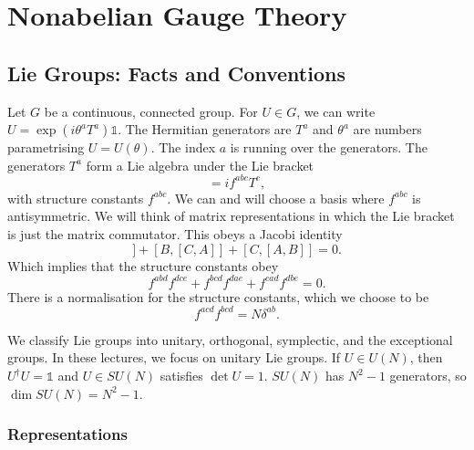 
\chapter{Nonabelian Gauge Theory}%
\label{cha:nonabelian_gauge_theory}

\section{Lie Groups: Facts and Conventions}%
\label{sec:lie_groups_facts_and_conventions}

Let $G$ be a continuous, connected group.
For $U \in G$, we can write $U = \exp(i \theta^{a} T^{a}) \mathbb{1}$.
The Hermitian generators are $T^{a}$ and $\theta^{a}$ are numbers parametrising $U = U(\theta)$.
The index $a$ is running over the generators.
The generators $T^{a}$ form a Lie algebra under the Lie bracket
\begin{equation}
  [T^{a}, T^{b}] = i f^{abc} T^{c},
\end{equation}
with structure constants $f^{abc}$. We can and will choose a basis where $f^{abc}$ is antisymmetric.
We will think of matrix representations in which the Lie bracket is just the matrix commutator.
This obeys a Jacobi identity
\begin{equation}
  [A, [B, C]] + [B, [C, A]] + [C, [A, B]] =0.
\end{equation}
Which implies that the structure constants obey
\begin{equation}
  f^{abd} f^{dce} + f^{bcd} f^{dae} + f^{cad} f^{dbe} = 0.
\end{equation}
There is a normalisation for the structure constants, which we choose to be
\begin{equation}
  f^{acd} f^{bcd} = N \delta^{ab}.
\end{equation}

We classify Lie groups into unitary, orthogonal, symplectic, and the exceptional groups.
In these lectures, we focus on unitary Lie groups.
If $U \in U(N)$, then $U^{\dagger} U = \mathbb{1}$ and $U \in SU(N)$ satisfies $\det U = 1$.
$SU(N)$ has $N^2 - 1$ generators, so $\dim SU(N) = N^2 - 1$.

\subsection{Representations}%
\label{sub:representations}

